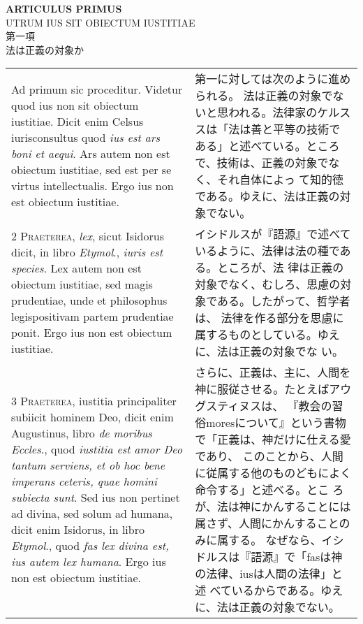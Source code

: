 \documentclass[10pt]{jsarticle} %
\begin{document}
\begin{center}
{\Large {\bfseries ARTICULUS PRIMUS}}\\
{\large UTRUM IUS SIT OBIECTUM IUSTITIAE}\\
{\Large 第一項\\法は正義の対象か}
\end{center}

\begin{longtable}{p{21em}p{21em}}

{\huge A}{\sc d primum sic proceditur}. 
Videtur quod ius non sit obiectum iustitiae. Dicit enim Celsus
 iurisconsultus quod {\itshape ius est ars boni et aequi}. Ars autem non est
 obiectum iustitiae, sed est per se virtus intellectualis. Ergo ius non
 est obiectum iustitiae.

&

第一に対しては次のように進められる。
法は正義の対象でないと思われる。法律家のケルススは「法は善と平等の技術で
 ある」と述べている。ところで、技術は、正義の対象でなく、それ自体によっ
 て知的徳である。ゆえに、法は正義の対象でない。


\\


{\scshape 2 Praeterea}, {\itshape lex}, sicut Isidorus dicit, in libro
 {\itshape Etymol}., {\itshape iuris est species}. Lex autem non est
 obiectum iustitiae, sed magis prudentiae, unde et philosophus
 legispositivam partem prudentiae ponit. Ergo ius non est obiectum
 iustitiae.


&

イシドルスが『語源』で述べているように、法律は法の種である。ところが、法
 律は正義の対象でなく、むしろ、思慮の対象である。したがって、哲学者は、
 法律を作る部分を思慮に属するものとしている。ゆえに、法は正義の対象でな
 い。

\\



{\scshape 3 Praeterea}, iustitia principaliter subiicit hominem Deo,
 dicit enim Augustinus, libro {\itshape de moribus Eccles}., quod
 {\itshape iustitia est amor Deo tantum serviens, et ob hoc bene
 imperans ceteris, quae homini subiecta sunt}. Sed ius non pertinet ad
 divina, sed solum ad humana, dicit enim Isidorus, in libro {\itshape
 Etymol}., quod {\itshape fas lex divina est, ius autem lex
 humana}. Ergo ius non est obiectum iustitiae.

&

さらに、正義は、主に、人間を神に服従させる。たとえばアウグスティヌスは、
 『教会の習俗moresについて』という書物で「正義は、神だけに仕える愛であり、
 このことから、人間に従属する他のものどもによく命令する」と述べる。とこ
 ろが、法は神にかんすることには属さず、人間にかんすることのみに属する。
 なぜなら、イシドルスは『語源』で「fasは神の法律、iusは人間の法律」と述
 べているからである。ゆえに、法は正義の対象でない。


\end{longtable}
\end{document}
